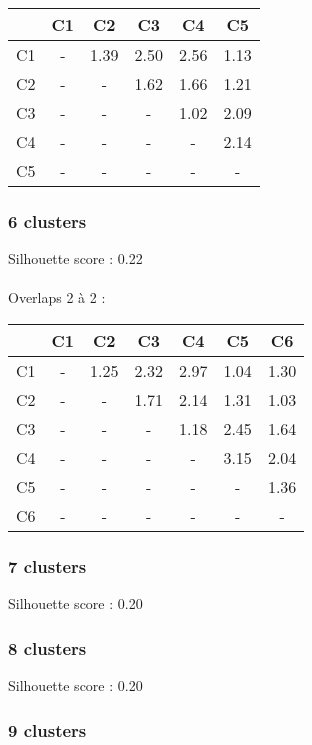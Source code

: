 \documentclass{article}
\begin{document}
\begin{tabular}{|c|c|c|c|c|c|}
\hline
& C1 & C2 & C3 & C4 & C5 \\
\hline
C1 & - & 1.39 & 2.50 & 2.56 & 1.13 \\
\hline
C2 & - & - & 1.62 & 1.66 & 1.21 \\
\hline
C3 & - & - & - & 1.02 &2.09 \\
\hline
C4 & - & - & - & - & 2.14 \\
\hline
C5 & - & - & - & - & - \\
\hline
\end{tabular}

\subsubsection*{6 clusters}

Silhouette score : 0.22 \\\\
Overlaps 2 à 2 :\\

\begin{tabular}{|c|c|c|c|c|c|c|}
\hline
& C1 & C2 & C3 & C4 & C5 & C6 \\
\hline
C1 & - & 1.25 & 2.32 & 2.97 & 1.04 & 1.30 \\
\hline
C2 & - & - & 1.71 & 2.14 & 1.31 & 1.03 \\
\hline
C3 & - & - & - & 1.18 & 2.45 & 1.64 \\
\hline
C4 & - & - & - & - & 3.15 & 2.04 \\
\hline
C5 & - & - & - & - & - & 1.36 \\
\hline
C6 & - & - & - & - & - & - \\
\hline
\end{tabular}

\subsubsection*{7 clusters}

Silhouette score : 0.20

\subsubsection*{8 clusters}

Silhouette score : 0.20

\subsubsection*{9 clusters}
\end{document}
